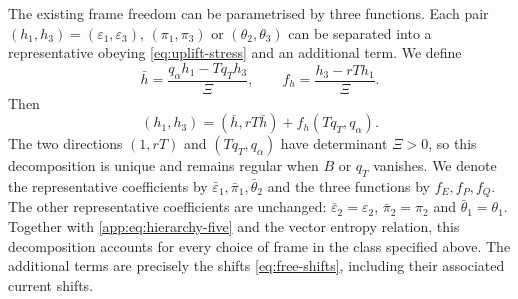 The existing frame freedom can be parametrised by three functions. Each pair $(h_1,h_3)=(\varepsilon_1,\varepsilon_3)$,
$(\pi_1,\pi_3)$ or $(\theta_2,\theta_3)$ can be separated into a
representative obeying \eqref{eq:uplift-stress} and an additional term.
We define
\begin{equation}\label{app:eq:hierarchy-inverse}
 \bar h=\frac{q_\alpha h_1-Tq_Th_3}{\Xi},\qquad
 f_h=\frac{h_3-rTh_1}{\Xi}.
\end{equation}
Then
\begin{equation}\label{app:eq:hierarchy-decomposition}
 (h_1,h_3)=(\bar h,rT\bar h)+f_h(Tq_T,q_\alpha).
\end{equation}
The two directions $(1,rT)$ and $(Tq_T,q_\alpha)$ have determinant
$\Xi>0$, so this decomposition is unique and remains regular when
$B$ or $q_T$ vanishes.
We denote the representative coefficients by
$\bar\varepsilon_1,\bar\pi_1,\bar\theta_2$ and the three functions by
$f_E,f_P,f_Q$. The other representative coefficients are unchanged:
$\bar\varepsilon_2=\varepsilon_2$, $\bar\pi_2=\pi_2$ and
$\bar\theta_1=\theta_1$. Together with \eqref{app:eq:hierarchy-five} and the vector entropy
relation, this decomposition accounts for every choice of frame in the class
specified above. The additional terms are precisely the shifts
\eqref{eq:free-shifts}, including their associated current shifts.

